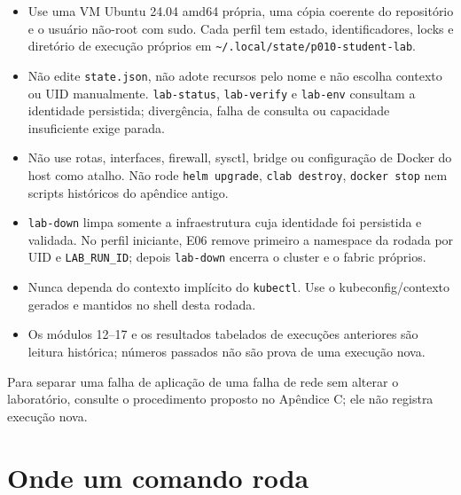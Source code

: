 \documentclass[12pt,openany,oneside,a4paper,chapter=TITLE,english,brazil]{abntex2}
\providecommand{\tightlist}{\setlength{\itemsep}{0pt}\setlength{\parskip}{0pt}}
\begin{document}
\begin{itemize}
\tightlist
\item
  Use uma VM Ubuntu 24.04 amd64 própria, uma cópia coerente do repositório e o usuário não-root com sudo. Cada perfil tem estado, identificadores, locks e diretório de execução próprios em \texttt{\textasciitilde{}/\allowbreak{}.\allowbreak{}local/\allowbreak{}state/\allowbreak{}p010-{}\allowbreak{}student-{}\allowbreak{}lab}.
\item
  Não edite \texttt{state.\allowbreak{}json}, não adote recursos pelo nome e não escolha contexto ou UID manualmente. \texttt{lab-{}\allowbreak{}status}, \texttt{lab-{}\allowbreak{}verify} e \texttt{lab-{}\allowbreak{}env} consultam a identidade persistida; divergência, falha de consulta ou capacidade insuficiente exige parada.
\item
  Não use rotas, interfaces, firewall, sysctl, bridge ou configuração de Docker do host como atalho. Não rode \texttt{helm upgrade}, \texttt{clab destroy}, \texttt{docker stop} nem scripts históricos do apêndice antigo.
\item
  \texttt{lab-{}\allowbreak{}down} limpa somente a infraestrutura cuja identidade foi persistida e validada. No perfil iniciante, E06 remove primeiro a namespace da rodada por UID e \texttt{LAB\_\allowbreak{}RUN\_\allowbreak{}ID}; depois \texttt{lab-{}\allowbreak{}down} encerra o cluster e o fabric próprios.
\item
  Nunca dependa do contexto implícito do \texttt{kubectl}. Use o kubeconfig/contexto gerados e mantidos no shell desta rodada.
\item
  Os módulos 12--17 e os resultados tabelados de execuções anteriores são leitura histórica; números passados não são prova de uma execução nova.
\end{itemize}

Para separar uma falha de aplicação de uma falha de rede sem alterar o laboratório, consulte o procedimento proposto no Apêndice C; ele não registra execução nova.

\section*{Onde um comando roda}\label{onde-um-comando-roda}
\end{document}
